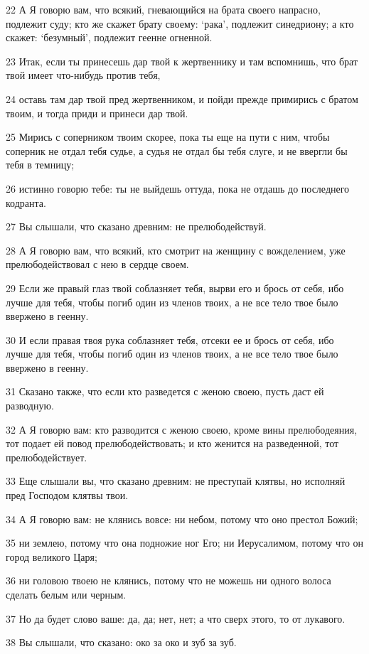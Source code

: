 \par 22 А Я говорю вам, что всякий, гневающийся на брата своего напрасно, подлежит суду; кто же скажет брату своему: `рака', подлежит синедриону; а кто скажет: `безумный', подлежит геенне огненной.
\par 23 Итак, если ты принесешь дар твой к жертвеннику и там вспомнишь, что брат твой имеет что-нибудь против тебя,
\par 24 оставь там дар твой пред жертвенником, и пойди прежде примирись с братом твоим, и тогда приди и принеси дар твой.
\par 25 Мирись с соперником твоим скорее, пока ты еще на пути с ним, чтобы соперник не отдал тебя судье, а судья не отдал бы тебя слуге, и не ввергли бы тебя в темницу;
\par 26 истинно говорю тебе: ты не выйдешь оттуда, пока не отдашь до последнего кодранта.
\par 27 Вы слышали, что сказано древним: не прелюбодействуй.
\par 28 А Я говорю вам, что всякий, кто смотрит на женщину с вожделением, уже прелюбодействовал с нею в сердце своем.
\par 29 Если же правый глаз твой соблазняет тебя, вырви его и брось от себя, ибо лучше для тебя, чтобы погиб один из членов твоих, а не все тело твое было ввержено в геенну.
\par 30 И если правая твоя рука соблазняет тебя, отсеки ее и брось от себя, ибо лучше для тебя, чтобы погиб один из членов твоих, а не все тело твое было ввержено в геенну.
\par 31 Сказано также, что если кто разведется с женою своею, пусть даст ей разводную.
\par 32 А Я говорю вам: кто разводится с женою своею, кроме вины прелюбодеяния, тот подает ей повод прелюбодействовать; и кто женится на разведенной, тот прелюбодействует.
\par 33 Еще слышали вы, что сказано древним: не преступай клятвы, но исполняй пред Господом клятвы твои.
\par 34 А Я говорю вам: не клянись вовсе: ни небом, потому что оно престол Божий;
\par 35 ни землею, потому что она подножие ног Его; ни Иерусалимом, потому что он город великого Царя;
\par 36 ни головою твоею не клянись, потому что не можешь ни одного волоса сделать белым или черным.
\par 37 Но да будет слово ваше: да, да; нет, нет; а что сверх этого, то от лукавого.
\par 38 Вы слышали, что сказано: око за око и зуб за зуб.
